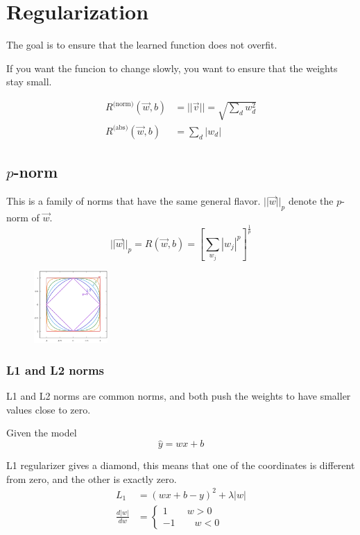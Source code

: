 \documentclass[a4paper,6pt,twocolumn,fleqn]{article}
\begin{document}
\section{Regularization}
The goal is to ensure that the learned function does not overfit.

If you want the funcion to change slowly, you want to ensure that the weights stay small.

\begin{align}
    R^\text{(norm)} (\vec w, b) &= || \vec v || = \sqrt{\sum_d w_d^2}\\
    R^\text{(abs)} (\vec w, b) &= \sum_d |w_d|
\end{align}
\subsection{\(p\)-norm} %
This is a family of norms that have the same general flavor. \(||\vec w||_p\) denote the \(p\)-norm of \(\vec w\).
\begin{equation}
    ||\vec w||_p = R(\vec w, b) = \left[\sum_{w_j} |w_j|^p\right]^{\frac 1 p}
\end{equation}
\begin{figure}[h]
    \vspace{-10pt}
	\begin{center}
		\includegraphics[width=0.25\textwidth]{040}
	\end{center}
    \vspace{-20pt}
\end{figure}
\subsubsection{L1 and L2 norms} %
L1 and L2 norms are common norms, and both push the weights to have smaller values close to zero.

Given the model
\begin{equation}
    \hat y = wx + b
\end{equation}

L1 regularizer gives a diamond, this means that one of the coordinates is different from zero, and the other is exactly zero.
\begin{align}
    L_1 &= (w x + b - y)^2 + \lambda |w|\\
    \frac {d|w|} {dw} &= \begin{cases}
        1 \qquad w > 0\\
        -1 \qquad w < 0
    \end{cases}
\end{align}
\end{document}
